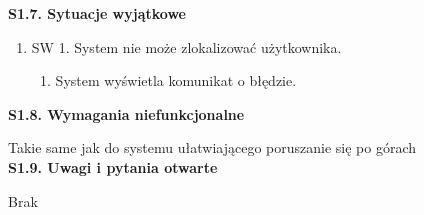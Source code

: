     \textbf{S1.7. Sytuacje wyjątkowe} \par
    \begin{enumerate}
        \item[] SW 1. System nie może zlokalizować użytkownika.
           \begin{enumerate}
                \item  System wyświetla komunikat o błędzie.
            \end{enumerate}
    \end{enumerate}
    \textbf{S1.8. Wymagania niefunkcjonalne} \par
    Takie same jak do systemu ułatwiającego poruszanie się po górach \\
    \textbf{S1.9. Uwagi i pytania otwarte} \par
    Brak

